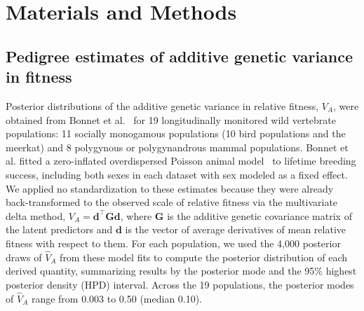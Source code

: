 \documentclass{article}
\begin{document}
    \linenumbers
\fi

\section{Materials and Methods}

\subsection{Pedigree estimates of additive genetic variance in fitness}\label{sec:meth_va}
Posterior distributions of the additive genetic variance in relative fitness, $V_A$, were obtained from Bonnet et al.~\cite{bonnet2022} for 19 longitudinally monitored wild vertebrate populations: 11 socially monogamous populations (10 bird populations and the meerkat) and 8 polygynous or polygynandrous mammal populations. Bonnet et al. fitted a zero-inflated overdispersed Poisson animal model~\cite{henderson1975,kruuk2004,wilson2010} to lifetime breeding success, including both sexes in each dataset with sex modeled as a fixed effect. We applied no standardization to these estimates because they were already back-transformed to the observed scale of relative fitness via the multivariate delta method, $V_A = \mathbf{d}^\top\mathbf{G}\mathbf{d}$, where $\mathbf{G}$ is the additive genetic covariance matrix of the latent predictors and $\mathbf{d}$ is the vector of average derivatives of mean relative fitness with respect to them. For each population, we used the 4,000 posterior draws of $\hat{V}_A$ from these model fits to compute the posterior distribution of each derived quantity, summarizing results by the posterior mode and the 95\% highest posterior density (HPD) interval. Across the 19 populations, the posterior modes of $\hat{V}_A$ range from 0.003 to 0.50 (median 0.10).
\end{document}
